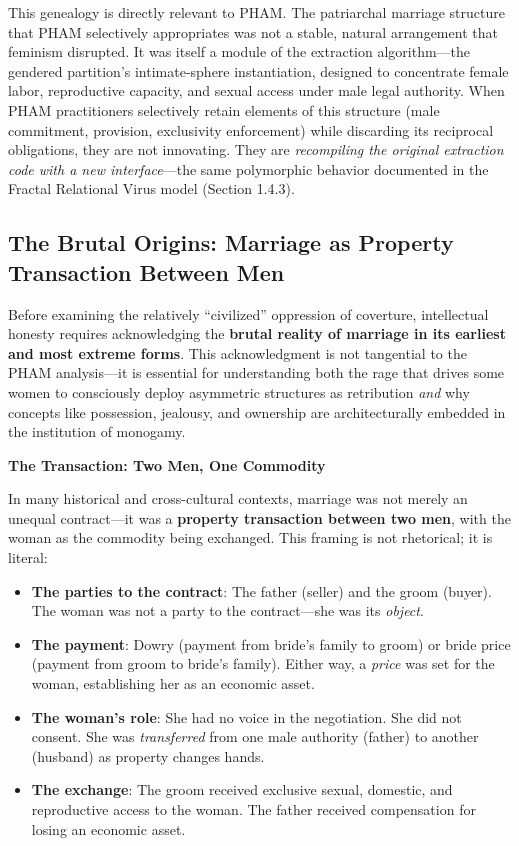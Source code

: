 \documentclass[12pt,openany]{book}
\numberwithin{equation}{chapter}
\begin{document}
This genealogy is directly relevant to PHAM. The patriarchal marriage structure that PHAM selectively appropriates was not a stable, natural arrangement that feminism disrupted. It was itself a module of the extraction algorithm---the gendered partition's intimate-sphere instantiation, designed to concentrate female labor, reproductive capacity, and sexual access under male legal authority. When PHAM practitioners selectively retain elements of this structure (male commitment, provision, exclusivity enforcement) while discarding its reciprocal obligations, they are not innovating. They are \textit{recompiling the original extraction code with a new interface}---the same polymorphic behavior documented in the Fractal Relational Virus model (Section 1.4.3).

\subsection{The Brutal Origins: Marriage as Property Transaction Between Men}

Before examining the relatively ``civilized'' oppression of coverture, intellectual honesty requires acknowledging the \textbf{brutal reality of marriage in its earliest and most extreme forms}. This acknowledgment is not tangential to the PHAM analysis---it is essential for understanding both the rage that drives some women to consciously deploy asymmetric structures as retribution \textit{and} why concepts like possession, jealousy, and ownership are architecturally embedded in the institution of monogamy.

\textbf{The Transaction: Two Men, One Commodity}

In many historical and cross-cultural contexts, marriage was not merely an unequal contract---it was a \textbf{property transaction between two men}, with the woman as the commodity being exchanged. This framing is not rhetorical; it is literal:

\begin{itemize}
    \item \textbf{The parties to the contract}: The father (seller) and the groom (buyer). The woman was not a party to the contract---she was its \textit{object}.
    \item \textbf{The payment}: Dowry (payment from bride's family to groom) or bride price (payment from groom to bride's family). Either way, a \textit{price} was set for the woman, establishing her as an economic asset.
    \item \textbf{The woman's role}: She had no voice in the negotiation. She did not consent. She was \textit{transferred} from one male authority (father) to another (husband) as property changes hands.
    \item \textbf{The exchange}: The groom received exclusive sexual, domestic, and reproductive access to the woman. The father received compensation for losing an economic asset.
\end{itemize}
\end{document}
